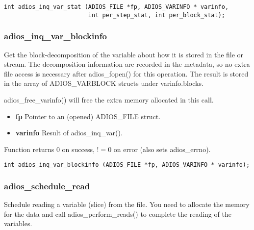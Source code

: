 \begin{lstlisting}[language=ADIOS]
int adios_inq_var_stat (ADIOS_FILE *fp, ADIOS_VARINFO * varinfo,
                        int per_step_stat, int per_block_stat);
\end{lstlisting}

\subsubsection*{adios\_inq\_var\_blockinfo}
Get the block-decomposition of the variable about how it is stored in 
the file or stream. The decomposition information are recorded in the
metadata, so no extra file access is necessary after adios\_fopen() for 
this operation. The result is stored in the array of 
ADIOS\_VARBLOCK structs under varinfo.blocks. 

adios\_free\_varinfo() will free the extra memory allocated in this call.
\begin{itemize} 
\item{\bf fp}       Pointer to an (opened) ADIOS\_FILE struct.
\item{\bf varinfo}  Result of adios\_inq\_var(). 
\end{itemize}
Function returns 0 on success, $!=0$ on error (also sets adios\_errno).

\begin{lstlisting}[language=ADIOS]
int adios_inq_var_blockinfo (ADIOS_FILE *fp, ADIOS_VARINFO * varinfo);
\end{lstlisting}

\subsubsection*{adios\_schedule\_read}
Schedule reading a variable (slice) from the file.
You need to allocate the memory for the data and call adios\_perform\_reads() to 
complete the reading of the variables.

